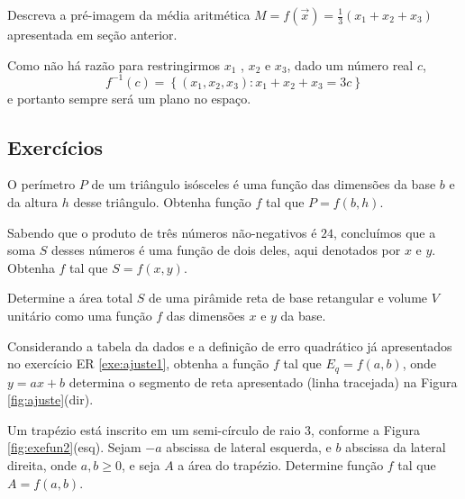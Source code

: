 \begin{exeresol}
Descreva a pré-imagem da média aritmética $M = f\left(\vec{x}\right) = \frac{1}{3}(x_1+x_2+x_3)$ apresentada em seção anterior. 
\end{exeresol}
\begin{resol}
Como não há razão para restringirmos $x_1$ , $x_2$ e $x_3$, dado um número real $c$,
\begin{equation}
f^{-1}(c) = \left\{ (x_1,x_2,x_3) : x_1 + x_2 + x_3 = 3c \right\}
\end{equation}
e portanto sempre será um plano no espaço.
\end{resol}


\subsection*{Exercícios}

\begin{exer}
O perímetro $P$ de um triângulo isósceles é uma função das dimensões da base $b$ e da altura $h$ desse triângulo.  Obtenha função $f$ tal que $P = f(b,h)$.
\end{exer}

\begin{exer}
Sabendo que o produto de três números não-negativos é $24$, concluímos que a soma $S$ desses números é uma função de dois deles, aqui denotados por $x$ e $y$. Obtenha $f$ tal que $S=f(x,y)$.
\end{exer}

\begin{exer}
Determine a área total $S$ de uma pirâmide reta de base retangular e volume $V$ unitário como uma função $f$ das dimensões $x$ e $y$ da base.
\end{exer}

\begin{exer}
Considerando a tabela da dados e a definição de erro quadrático já apresentados no exercício ER \ref{exe:ajuste1}, obtenha a função $f$ tal que $E_q = f(a,b)$, onde $y = ax + b$  determina o segmento de reta apresentado (linha tracejada) na Figura \ref{fig:ajuste}(dir).
\end{exer}

\begin{exer}
Um trapézio está inscrito em um semi-círculo de raio $3$, conforme a Figura \ref{fig:exefun2}(esq). Sejam $-a$ abscissa de lateral esquerda, e $b$ abscissa da lateral direita, onde $a,b \geq 0$, e seja $A$ a área do trapézio. Determine função $f$ tal que $A = f(a,b)$.
\end{exer}

